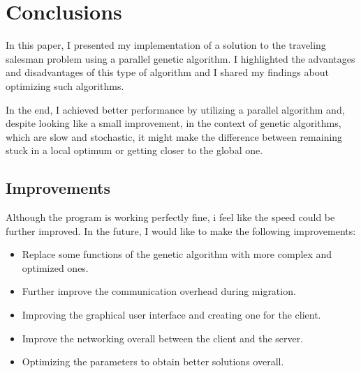 \chapter*{Conclusions} 

In this paper, I presented my implementation of a solution to the traveling salesman problem using a parallel genetic algorithm. I highlighted the advantages and disadvantages of this type of algorithm and I shared my findings about optimizing such algorithms.
\par
In the end, I achieved better performance by utilizing a parallel algorithm and, despite looking like a small improvement, in the context of genetic algorithms, which are slow and stochastic, it might make the difference between remaining stuck in a local optimum or getting closer to the global one.

\section*{Improvements}

Although the program is working perfectly fine, i feel like the speed could be further improved. In the future, I would like to make the following improvements:
\begin{itemize}
    \item Replace some functions of the genetic algorithm with more complex and optimized ones.
    \item Further improve the communication overhead during migration.
    \item Improving the graphical user interface and creating one for the client.
    \item Improve the networking overall between the client and the server.
    \item Optimizing the parameters to obtain better solutions overall.
\end{itemize}
